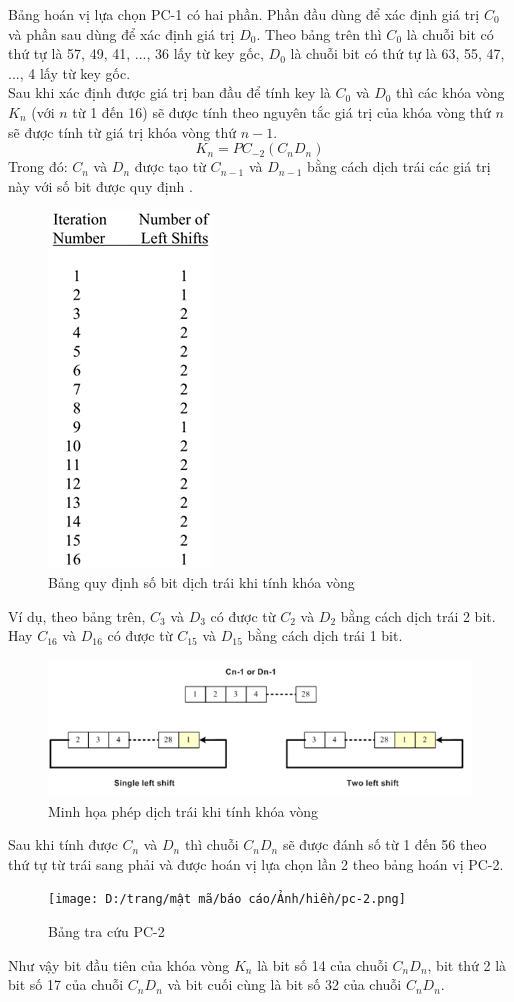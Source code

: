 Bảng hoán vị lựa chọn PC-1 có hai phần. Phần đầu dùng để xác định giá trị $C_0$ và phần sau dùng để xác định giá trị $D_0$. Theo bảng trên thì $C_0$ là chuỗi bit có thứ tự là 57, 49, 41, ..., 36 lấy từ key gốc, $D_0$ là chuỗi bit có thứ tự là 63, 55, 47, ..., 4 lấy từ key gốc.\cite{Khanh2014}\\
\indent Sau khi xác định được giá trị ban đầu để tính key là $C_0$ và $D_0$ thì các khóa vòng $K_n$ (với $n$ từ 1 đến 16) sẽ được tính theo nguyên tắc giá trị của khóa vòng thứ $n$ sẽ được tính từ giá trị khóa vòng thứ $n-1$.
\[{K_n} = P{C_{ - 2}}({C_n}{D_n})\]
Trong đó: $C_{n}$ và $D_{n}$ được tạo từ $C_{n-1}$ và $D_{n-1}$ bằng cách dịch trái các giá trị này với số bit được quy định \cite{Khanh2014}.
\begin{figure}[H]
	\centering
	\includegraphics[scale=1]{"Ảnh/hiền/dịch trái"}
	\caption{Bảng quy định số bit dịch trái khi tính khóa vòng}
	\label{fig:dich-trai}
\end{figure}
Ví dụ, theo bảng trên, $C_{3}$ và $D_{3}$ có được từ $C_{2}$ và $D_{2}$ bằng cách dịch trái 2 bit. Hay $C_{16}$ và $D_{16}$ có được từ $C_{15}$ và $D_{15}$ bằng cách dịch trái 1 bit.
\begin{figure}[H]
	\centering
	\includegraphics[width=\textwidth]{"Ảnh/hiền/quy tắc dịch trái"}
	\caption{Minh họa phép dịch trái khi tính khóa vòng}
	\label{fig:quy-tac-dich-trai}
\end{figure}
Sau khi tính được $C_n$ và $D_n$ thì chuỗi $C_nD_n$ sẽ được đánh số từ 1 đến 56 theo thứ tự từ trái sang phải và được hoán vị lựa chọn lần 2 theo bảng hoán vị PC-2.
\begin{figure}[H]
    \centering
    \texttt{[image: D:/trang/mật mã/báo cáo/Ảnh/hiền/pc-2.png]}
    \caption{Bảng tra cứu PC-2}
\end{figure}
Như vậy bit đầu tiên của khóa vòng $K_n$ là bit số 14 của chuỗi $C_nD_n$, bit thứ 2 là bit số 17 của chuỗi $C_nD_n$ và bit cuối cùng là bit số 32 của chuỗi $C_nD_n$.


